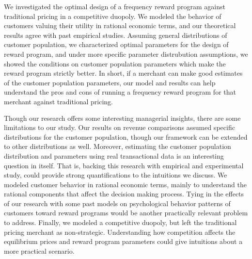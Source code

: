 We investigated the optimal design of a frequency reward program against traditional pricing in a competitive duopoly.
We modeled the behavior of customers valuing their utility in rational economic terms, and our theoretical results agree with past empirical studies.
Assuming general distributions of customer population, we characterized optimal parameters for the design of reward program, and under more specific parameter distrubution assumptions, we showed the conditions on customer population parameters which make the reward program strictly better.
In short, if a merchant can make good estimates of the customer population parameters, our model and results can help understand the pros and cons of running a frequency reward program for that merchant against traditional pricing.

Though our research offers some interesting managerial insights, there are some limitations to our study. 
Our results on revenue comparisons assumed specific distributions for the customer population, though our framework can be extended to other distributions as well. Moreover, estimating the customer population distribution and parameters using real transactional data is an interesting question in itself.
That is, backing this research with empirical and experimental study, could provide strong quantifications to the intuitions we discuss.
We modeled customer behavior in rational economic terms, mainly to understand the rational components that affect the decision making process.
Tying in the effects of our research with some past models on psychological behavior patterns of customers toward reward programs would be another practically relevant problem to address.
Finally, we modeled a competitive duopoly, but left the traditional pricing merchant as non-strategic.
Understanding how competition affects the equilibrium prices and reward program parameters could give intuitions about a more practical scenario. 
